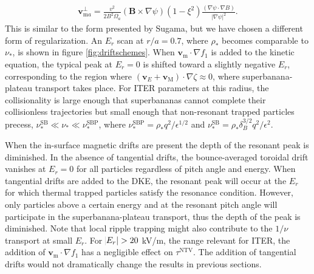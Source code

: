 \documentclass[aip, pop, preprint]{revtex4-1}
\numberwithin{figure}{section}
\numberwithin{equation}{section}
\begin{document}
\begin{gather}
\bm{v}_{\text{m}a}^{\perp} = \frac{v^2}{2B^2 \Omega_a} (\bm{B} \times \nabla \psi) (1 - \xi^2) \frac{(\nabla \psi \cdot \nabla B)}{\rvert \nabla \psi \rvert^2}.
\label{eq:mds5}
\end{gather}
This is similar to the form presented by Sugama,\cite{Sugama2016} but we have chosen a different form of regularization. An $E_r$ scan at $r/a = 0.7$, where $\rho_*$ becomes comparable to $\nu_*$, is shown in figure \ref{fig:driftschemes}. When $\bm{v}_{\text{m}} \cdot \nabla f_1$ is added to the kinetic equation, the typical peak at $E_r = 0$ is shifted toward a slightly negative $E_r$, corresponding to the region where $(\bm{v}_E + \bm{v}_\text{M})\cdot \nabla \zeta \approx 0$, where superbanana-plateau transport takes place. For ITER parameters at this radius, the collisionality is large enough that superbananas cannot complete their collisionless trajectories but small enough that non-resonant trapped particles precess, $\nu_*^{\text{SB}} \ll \nu_* \ll \nu_*^{\text{SBP}}$, where $\nu_*^{\text{SBP}} = \rho_*q^2/\epsilon^{1/2}$ and $\nu_*^{\text{SB}} = \rho_* \delta_B^{3/2} q^2/\epsilon^2$.\cite{Shaing2009_sb, Shaing2009_sbp} 

When the in-surface magnetic drifts are present the depth of the resonant peak is diminished. In the absence of tangential drifts, the bounce-averaged toroidal drift vanishes at $E_r = 0$ for all particles regardless of pitch angle and energy. When tangential drifts are added to the DKE, the resonant peak will occur at the $E_r$ for which thermal trapped particles satisfy the resonance condition. However, only particles above a certain energy and at the resonant pitch angle will participate in the superbanana-plateau transport, thus the depth of the peak is diminished. Note that local ripple trapping might also contribute to the $1/\nu$ transport at small $E_r$. For $\abs{E_r} > 20$ kV/m, the range relevant for ITER, the addition of $\bm{v}_{\text{m}}\cdot \nabla f_1$ has a negligible effect on $\tau^{\text{NTV}}$. The addition of tangential drifts would not dramatically change the results in previous sections.  
\end{document}
